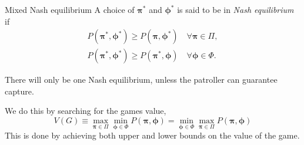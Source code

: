 \documentclass[11pt]{beamer}
\begin{document}
\begin{frame}{\insertsection}
\begin{block}{Mixed Nash equilibrium}
A choice of $\bm{\pi}^*$ and $\bm{\phi}^*$ is said to be in \textit{Nash equilibrium} if 
\begin{align*}
P(\bm{\pi}^*,\bm{\phi}^*) \geq P(\bm{\pi},\bm{\phi}^*) \quad \forall \bm{\pi} \in \Pi , \\
P(\bm{\pi}^*,\bm{\phi}^*) \geq P(\bm{\pi}^*,\bm{\phi}) \quad \forall \bm{\phi} \in \Phi .
\end{align*}
\end{block}
There will only be one Nash equilibrium, unless the patroller can guarantee capture.

We do this by searching for the games value, $$V(G) \equiv \max\limits_{\bm{\pi} \in \Pi} \min\limits_{\bm{\phi} \in \Phi} P(\bm{\pi},\bm{\phi})=\min\limits_{\bm{\phi} \in \Phi} \max\limits_{\bm{\pi} \in \Pi} P(\bm{\pi},\bm{\phi})$$
This is done by achieving both upper and lower bounds on the value of the game.
\end{frame}
\end{document}
